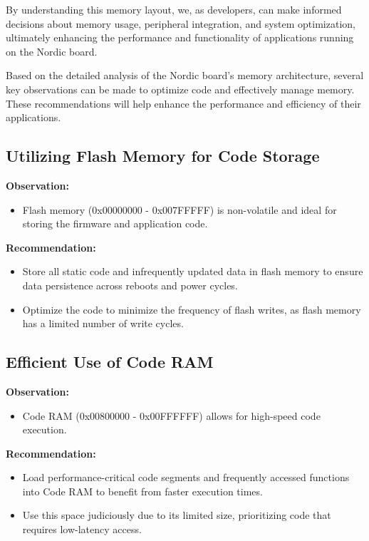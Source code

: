 \documentclass{Configuration_Files/PoliMi3i_thesis}
\begin{document}
By understanding this memory layout, we, as developers, can make informed decisions about memory usage, peripheral integration, and system optimization, ultimately enhancing the performance and functionality of applications running on the Nordic board.

Based on the detailed analysis of the Nordic board's memory architecture, several key observations can be made to optimize code and effectively manage memory. These recommendations will help enhance the performance and efficiency of their applications.

\subsection{Utilizing Flash Memory for Code Storage}
\textbf{Observation:}
\begin{itemize}
    \item Flash memory (0x00000000 - 0x007FFFFF) is non-volatile and ideal for storing the firmware and application code.
\end{itemize}

\textbf{Recommendation:}
\begin{itemize}
    \item Store all static code and infrequently updated data in flash memory to ensure data persistence across reboots and power cycles.
    \item Optimize the code to minimize the frequency of flash writes, as flash memory has a limited number of write cycles.
\end{itemize}

\subsection{Efficient Use of Code RAM}
\textbf{Observation:}
\begin{itemize}
    \item Code RAM (0x00800000 - 0x00FFFFFF) allows for high-speed code execution.
\end{itemize}

\textbf{Recommendation:}
\begin{itemize}
    \item Load performance-critical code segments and frequently accessed functions into Code RAM to benefit from faster execution times.
    \item Use this space judiciously due to its limited size, prioritizing code that requires low-latency access.
\end{itemize}
\end{document}

